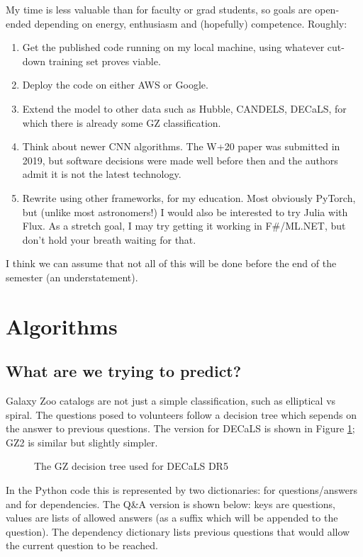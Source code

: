 \documentclass[twocolumn, twocolappendix, tighten]{aastex631}
\begin{document}
My time is less valuable than for faculty or grad students, so goals are open-ended depending on energy, enthusiasm and (hopefully) competence. Roughly:
\begin{enumerate}
	\item Get the published code running on my local machine, using whatever cut-down training set proves viable.
	\item Deploy the code on either AWS or Google.
	\item Extend the model to other data such as Hubble, CANDELS, DECaLS, for which there is already some GZ classification.
	\item Think about newer CNN algorithms. The W+20 paper was submitted in 2019, but software decisions were made well before then and the authors admit it is not the latest technology.
	\item Rewrite using other frameworks, for my education. Most obviously PyTorch, but (unlike most astronomers!) I would also be interested to try Julia with Flux. As a stretch goal, I may try getting it working in F\#/ML.NET, but don't hold your breath waiting for that.
\end{enumerate}

I think we can assume that not all of this will be done before the end of the semester (an understatement).

\section{Algorithms} \label{algorithms}

\subsection{What are we trying to predict?}

Galaxy Zoo catalogs are not just a simple classification, such as elliptical vs spiral. The questions posed to volunteers follow a decision tree which sepends on the answer to previous questions. The version for DECaLS is shown in Figure \ref{fig:decals_decisions}; GZ2 is similar but slightly simpler.

\begin{figure}[htb!]
	\caption{The GZ decision tree used for DECaLS DR5
		\label{fig:decals_decisions}}
\end{figure}

In the Python code this is represented by two dictionaries: for questions/answers and for dependencies. The Q\&A version is shown below: keys are questions, values are lists of allowed answers (as a suffix which will be appended to the question). The dependency dictionary lists previous questions that would allow the current question to be reached.
\end{document}
